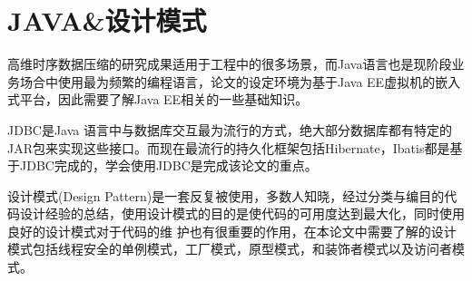 \section{JAVA\&设计模式}
\label{Section 2.5}

高维时序数据压缩的研究成果适用于工程中的很多场景，而Java语言也是现阶段业务场合中使用最为频繁的编程语言，论文的设定环境为基于Java 
EE虚拟机的嵌入式平台，因此需要了解Java EE相关的一些基础知识。


JDBC是Java 语言中与数据库交互最为流行的方式，绝大部分数据库都有特定的JAR包来实现这些接口。而现在最流行的持久化框架包括Hibernate，Ibatis都是基
于JDBC完成的，学会使用JDBC是完成该论文的重点。

设计模式(Design Pattern)是一套反复被使用，多数人知晓，经过分类与编目的代码设计经验的总结，使用设计模式的目的是使代码的可用度达到最大化，同时使用良好的设计模式对于代码的维
护也有很重要的作用，在本论文中需要了解的设计模式包括线程安全的单例模式，工厂模式，原型模式，和装饰者模式以及访问者模式。








